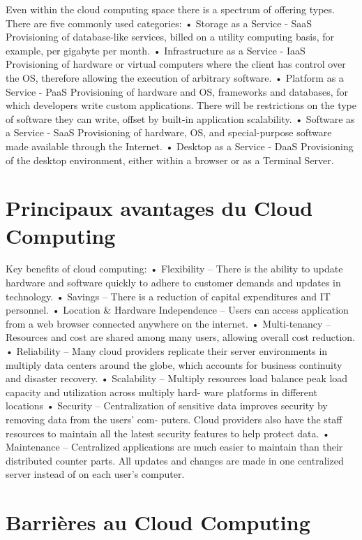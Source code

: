 Even within the cloud computing space there is a spectrum of offering types. There are five commonly used categories:
•  Storage as a Service - SaaS
Provisioning of database-like services, billed on a utility computing basis, for
example, per gigabyte per month.
•  Infrastructure as a Service - IaaS
Provisioning of hardware or virtual computers where the client has control over the OS, therefore allowing the execution of arbitrary software.
•  Platform as a Service - PaaS
Provisioning of hardware and OS, frameworks and databases, for which developers write custom applications. There will be restrictions on the type of software they can write, offset by built-in application scalability.
•  Software as a Service - SaaS
Provisioning of hardware, OS, and special-purpose software made available
through the Internet.
•  Desktop as a Service - DaaS
Provisioning of the desktop environment, either within a browser or as a Terminal Server.

\section{Principaux avantages du Cloud Computing}
Key benefits of cloud computing:
• Flexibility – There is the ability to update hardware and software quickly to adhere to customer demands and updates in technology.
• Savings – There is a reduction of capital expenditures and IT personnel.
• Location \& Hardware Independence – Users can access application from a web browser connected anywhere on the internet.
• Multi-tenancy – Resources and cost are shared among many users, allowing overall cost reduction.
• Reliability – Many cloud providers replicate their server environments in multiply data centers around the globe, which accounts for business continuity and disaster recovery.
• Scalability – Multiply resources load balance peak load capacity and utilization across multiply hard- ware platforms in different locations
• Security – Centralization of sensitive data improves security by removing data from the users’ com- puters. Cloud providers also have the staff resources to maintain all the latest security features to help protect data.
• Maintenance – Centralized applications are much easier to maintain than their distributed counter parts. All updates and changes are made in one centralized server instead of on each user’s computer.


\section{Barrières au Cloud Computing}

